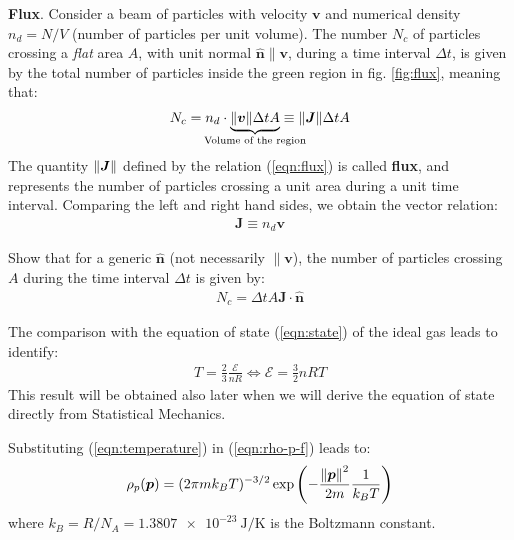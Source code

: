 \documentclass[../template.tex]{subfiles}
\begin{document}
\begin{appr}\textbf{Flux}. Consider a beam of particles with velocity $\bm{v}$ and numerical density $n_d = N/V$ (number of particles per unit volume). The number $N_c$ of particles crossing a \textit{flat} area $A$, with unit normal $\bm{\hat{n}} \parallel \bm{v}$, during a time interval $\Delta t$, is given by the total number of particles inside the green region in fig. \ref{fig:flux}, meaning that:
\begin{align}\label{eqn:flux}
    N_c = n_d \cdot \underbrace{\norm{\bm{v}} \Delta t A}_{\mathclap{\text{Volume of the region}}}  \equiv \norm{\bm{J}} \Delta t A
\end{align}   
The quantity $\norm{\bm{J}}$ defined by the relation (\ref{eqn:flux}) is called \textbf{flux}, and represents the number of particles crossing a unit area during a unit time interval. Comparing the left and right hand sides, we obtain the vector relation:
\begin{align*}
    \bm{J} \equiv n_d \bm{v}
\end{align*}
\end{appr}



\begin{exo} \label{exo:flux}
    Show that for a generic $\bm{\hat{n}}$ (not necessarily $\parallel \bm{v}$), the number of particles crossing $A$ during the time interval $\Delta t$ is given by:
    \begin{align*}
        N_c = \Delta t A \bm{J}\cdot \bm{\hat{n}}
    \end{align*} 
\end{exo}

The comparison with the equation of state (\ref{eqn:state}) of the ideal gas leads to identify:
    \begin{align}\label{eqn:temperature}
        T = \frac{2}{3} \frac{\mathcal{E}}{n R} \Leftrightarrow \mathcal{E}= \frac{3}{2} n R T   
    \end{align}
This result will be obtained also later when we will derive the equation of state directly from Statistical Mechanics.

\medskip

Substituting (\ref{eqn:temperature}) in (\ref{eqn:rho-p-f}) leads to:
\begin{align*}
    \rho_p(\bm{p}) = (2 \pi m k_B T)^{-3/2} \exp\left(-\frac{\norm{\bm{p}}^2}{2m} \frac{1}{k_B T}  \right)
\end{align*}
where $k_B = R/N_A = \SI{1.3807e-23}{\J\per\K}$ is the Boltzmann constant. 
\end{document}
